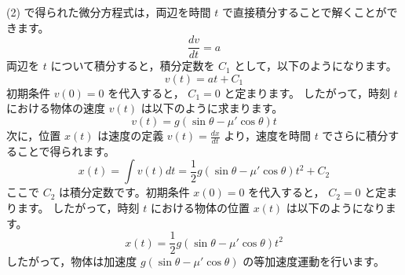 \begin{solutionparts}
(2) で得られた微分方程式は，両辺を時間 $t$ で直接積分することで解くことができます。
\begin{equation*}
\frac{dv}{dt} = a
\end{equation*}
両辺を $t$ について積分すると，積分定数を $C_1$ として，以下のようになります。
\begin{equation*}
v(t) = a t + C_1
\end{equation*}
初期条件 $v(0) = 0$ を代入すると， $C_1 = 0$ と定まります。 したがって，時刻 $t$ における物体の速度 $v(t)$ は以下のように求まります。
\begin{equation*}
v(t) = g (\sin \theta - \mu' \cos \theta) t
\end{equation*}
次に，位置 $x(t)$ は速度の定義 $v(t) = \frac{dx}{dt}$ より，速度を時間 $t$ でさらに積分することで得られます。
\begin{equation*}
x(t) = \int v(t) dt = \frac{1}{2} g (\sin \theta - \mu' \cos \theta) t^2 + C_2
\end{equation*}
ここで $C_2$ は積分定数です。初期条件 $x(0) = 0$ を代入すると， $C_2 = 0$ と定まります。 したがって，時刻 $t$ における物体の位置 $x(t)$ は以下のようになります。
\begin{equation*}
x(t) = \frac{1}{2} g (\sin \theta - \mu' \cos \theta) t^2
\end{equation*}
したがって，物体は加速度 $g (\sin \theta - \mu' \cos \theta)$ の等加速度運動を行います。

\end{solutionparts}
